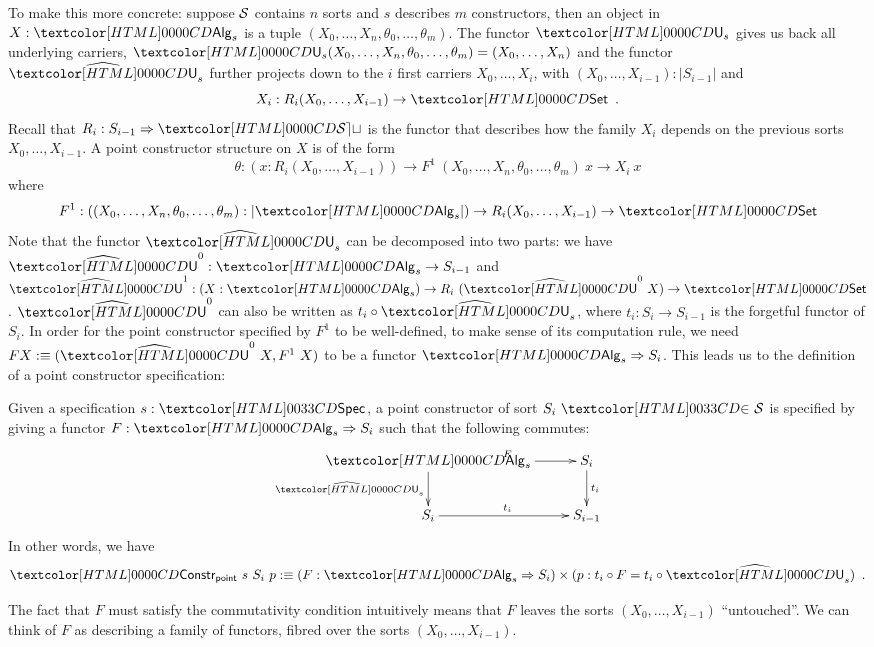 To make this more concrete: suppose $\mathcal{S}$ contains $n$ sorts and $s$
describes $m$ constructors, then an object in $X : \Alg_s$ is a tuple
$(X_0, \hdots, X_n, \theta_0, \hdots, \theta_m)$. The functor $\Und_s$
gives us back all underlying carriers, \ie
$\Und_s(X_0, \hdots, X_n, \theta_0, \hdots, \theta_m) = (X_0, \hdots,
X_n)$
and the functor $\extendfunc{\Und}_s$ further projects down to the $i$ first
carriers $X_0, \hdots, X_i$, with
$(X_0, \hdots, X_{i-1}) : | S_{i-1} |$ and
\[
X_i : R_i (X_0, \hdots, X_{i-1}) \to \Set \enspace .
\]
Recall that $R_i : \Func{S_{i-1}}{\SET}$ is the functor that describes how
the family $X_i$ depends on the previous sorts $X_0, \hdots,
X_{i-1}$. A point constructor structure on $X$ is of the form
$$
\theta : (x : R_i (X_0, \hdots, X_{i-1})) \to F^1\ (X_0, \hdots, X_n, \theta_0, \hdots, \theta_m)\ x \to X_i\ x
$$
where
$$
F^1 : ((X_0,\hdots,X_n,\theta_0,\hdots,\theta_m) : | \Alg_s |) \to R_i (X_0, \hdots, X_{i-1}) \to \Set
$$
Note that the functor $\extendfunc{\Und}_s$ can be decomposed into two parts: we
have $\extendfunc{\Und}^0 : \Alg_s \to S_{i-1}$ and
$\extendfunc{\Und}^1 : (X : \Alg_s) \to R_i\ (\extendfunc{\Und}^0\ X) \to \Set$.
$\extendfunc{\Und}^0$ can also be written as $t_i \circ \extendfunc{\Und}_s$, where
$t_i : S_i \to S_{i-1}$ is the forgetful functor of $S_i$. In order
for the point constructor specified by $F^1$ to be well-defined, \ie
to make sense of its computation rule, we need
$F X \ddefeq (\extendfunc{\Und}^0\ X, F^1\ X)$ to be a functor
$\Func{\Alg_s}{S_i}$.  This leads us to the definition of a point
constructor specification:

\begin{definition}
  \label{data-point-constructor}

  Given a specification $s : \specty$, a point constructor of sort
  $\sortsin{S_i}{\Ss}$ is specified by giving a functor
  $F : \Func{\Alg_s}{S_i}$ such that the following commutes:
  $$
  \xymatrix{
    \Alg_s \ar[r]^{F} \ar[d]_{\extendfunc{\Und}_s} &S_i \ar[d]^{t_i} \\
    S_i \ar[r]^{t_i} &S_{i-1}
  }
  $$
  In other words, we have
  $$
  \Constr_{\ident{point}}\ s\ S_i\ p \ddefeq (F : \Func{\Alg_s}{S_i}) \times (p : t_i \circ F = t_i \circ \extendfunc{\Und}_s) \enspace .
  $$
\end{definition} 

The fact that $F$ must satisfy the commutativity condition intuitively
means that $F$ leaves the sorts $(X_0, \hdots, X_{i-1})$
``untouched''. We can think of $F$ as describing a family of functors,
fibred over the sorts $(X_0, \hdots, X_{i-1})$.

